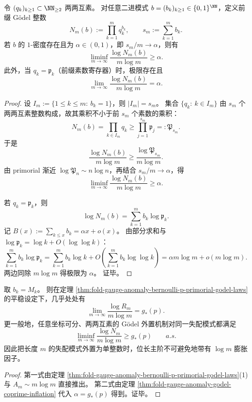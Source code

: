 \begin{theorem}\label{thm:fold-gauge-anomaly-godel-coprime-inflation}
令 \((q_k)_{k\ge1}\subset\NN_{\ge2}\) 两两互素。
对任意二进模式 \(b=(b_k)_{k\ge1}\in\{0,1\}^{\NN}\)，定义前缀 Gödel 整数
\[
N_m(b):=\prod_{k=1}^{m}q_k^{b_k},
\qquad
s_m:=\sum_{k=1}^{m}b_k.
\]
若 \(b\) 的 \(1\)-密度存在且为 \(\alpha\in(0,1)\)，即 \(s_m/m\to\alpha\)，则有
\[
\liminf_{m\to\infty}\frac{\log N_m(b)}{m\log m}\ge \alpha.
\]
此外，当 \(q_k=\mathfrak p_k\)（前缀素数寄存器）时，极限存在且
\[
\lim_{m\to\infty}\frac{\log N_m(b)}{m\log m}=\alpha.
\]
\end{theorem}
\begin{proof}
设
\(
I_m:=\{1\le k\le m:\ b_k=1\}
\)，则 \(|I_m|=s_m\)。
集合 \(\{q_k:\ k\in I_m\}\) 由 \(s_m\) 个两两互素整数构成，故其乘积不小于前 \(s_m\) 个素数的乘积：
\[
N_m(b)=\prod_{k\in I_m}q_k\ge \prod_{j=1}^{s_m}\mathfrak p_j=: \mathfrak P_{s_m}.
\]
于是
\[
\frac{\log N_m(b)}{m\log m}
\ge
\frac{\log \mathfrak P_{s_m}}{m\log m}.
\]
由 primorial 渐近 \(\log\mathfrak P_n\sim n\log n\)，再结合 \(s_m/m\to\alpha\)，得
\[
\liminf_{m\to\infty}\frac{\log N_m(b)}{m\log m}\ge \alpha.
\]
\par
若 \(q_k=\mathfrak p_k\)，则
\[
\log N_m(b)=\sum_{k=1}^{m}b_k\log\mathfrak p_k.
\]
记 \(B(x):=\sum_{k\le x}b_k=\alpha x+o(x)\)。
由部分求和与 \(\log\mathfrak p_k=\log k+O(\log\log k)\)：
\[
\sum_{k=1}^{m}b_k\log\mathfrak p_k
=
\sum_{k=1}^{m}b_k\log k
+O\!\left(\sum_{k=1}^{m}b_k\log\log k\right)
=
\alpha m\log m+o(m\log m).
\]
两边同除 \(m\log m\) 得极限为 \(\alpha\)。
证毕。
\end{proof}

\begin{corollary}\label{cor:fold-gauge-anomaly-mismatch-primorial-growth}
取 \(b_k=M_k\)。
则在定理 \ref{thm:fold-gauge-anomaly-bernoulli-p-primorial-godel-laws} 的平稳设定下，几乎处处有
\[
\lim_{m\to\infty}\frac{\log R_m}{m\log m}=g_\ast(p).
\]
更一般地，任意坐标可分、两两互素的 Gödel 外置机制对同一失配模式都满足
\[
\liminf_{m\to\infty}\frac{\log N_m}{m\log m}\ge g_\ast(p)\qquad a.s.
\]
因此把长度 \(m\) 的失配模式外置为单整数时，位长主阶不可避免地带有 \(\log m\) 膨胀因子。
\end{corollary}
\begin{proof}
第一式由定理 \ref{thm:fold-gauge-anomaly-bernoulli-p-primorial-godel-laws}(1) 与
\(
A_m\sim m\log m
\) 直接推出。
第二式由定理 \ref{thm:fold-gauge-anomaly-godel-coprime-inflation} 代入
\(
\alpha=g_\ast(p)
\) 得到。证毕。
\end{proof}

